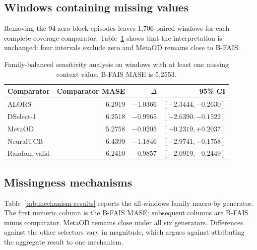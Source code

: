 \subsection{Windows containing missing values}

Removing the 94 zero-block episodes leaves 1,706 paired windows for each complete-coverage comparator. Table~\ref{tab:missing-window-view} shows that the interpretation is unchanged: four intervals exclude zero and MetaOD remains close to B-FAIS.

\begin{table}[h]
\centering
\small
\caption{Family-balanced sensitivity analysis on windows with at least one missing context value. B-FAIS MASE is 5.2553.}
\label{tab:missing-window-view}
\begin{tabular}{lrrr}
\toprule
Comparator & Comparator MASE & $\Delta$ & 95\% CI \\
\midrule
ALORS & 6.2919 & $-1.0366$ & $[-2.3444,-0.2630]$ \\
DSelect-1 & 6.2518 & $-0.9965$ & $[-2.6390,-0.1522]$ \\
MetaOD & 5.2758 & $-0.0205$ & $[-0.2319,+0.2037]$ \\
NeuralUCB & 6.4399 & $-1.1846$ & $[-2.9741,-0.1758]$ \\
Random-valid & 6.2410 & $-0.9857$ & $[-2.0919,-0.2449]$ \\
\bottomrule
\end{tabular}
\end{table}

\subsection{Missingness mechanisms}

Table~\ref{tab:mechanism-results} reports the all-windows family macro by generator. The first numeric column is the B-FAIS MASE; subsequent columns are B-FAIS minus comparator. MetaOD remains close under all six generators. Differences against the other selectors vary in magnitude, which argues against attributing the aggregate result to one mechanism.

